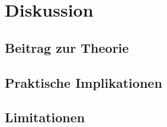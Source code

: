 \chapter{Diskussion}\label{chap:diskussion}

\section{Beitrag zur Theorie}\label{sec:beitrag}

\section{Praktische Implikationen}\label{sec:implikationen}

\section{Limitationen}\label{sec:limitationen}
